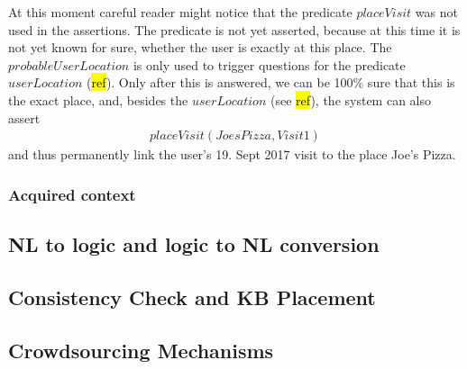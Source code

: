 At this moment careful reader might notice that the predicate $placeVisit$ was
not used in the assertions. The predicate is not yet asserted, because at 
this time it is not yet known for sure, whether the user is exactly at this 
place. The $probableUserLocation$ is only used to trigger questions for the
predicate $userLocation$ (\hl{ref}). Only after this is answered, we can be
100\% sure that this is the exact place, and, besides the $userLocation$ (see
\hl{ref}), the system can also assert
\begin{equation}\label{as:placeVisit}
\begin{gathered}
	placeVisit(JoesPizza,Visit1)
\end{gathered}
\end{equation}
and thus permanently link the user's 19. Sept 2017 visit to the place 
Joe's Pizza.

\subsubsection{Acquired context}
\label{section:acquiredContext}


\subsection{NL to logic and logic to NL conversion}
\label{section:nl}

\subsection{Consistency Check and KB Placement}
\label{section:consistency}

\subsection{Crowdsourcing Mechanisms}
\label{section:crowdsourcing}
